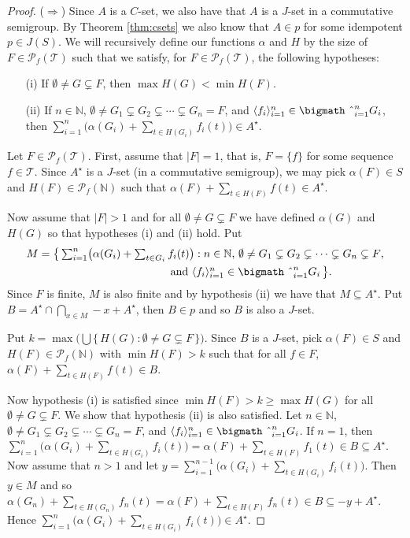 \documentclass[12pt,showtrims]{memoir}
\theoremstyle{plain}
\theoremstyle{definition}
\newcommand{\la}{\langle}
\newcommand{\ra}{\rangle}
\newcommand{\bbN}{\mathbb{N}}
\newcommand{\calT}{\mathcal{T}}
\newcommand{\Pf}{\mathcal{P}_f}
\newcommand{\bigtimes}{\hbox{\bigmath \char'2}}
\begin{document}
\begin{proof}
  ($\Rightarrow$)
  Since $A$ is a $C$-set, we also have that $A$ is a $J$-set in a commutative semigroup.
  By Theorem \ref{thm:csets} we also know that $A \in p$ for some idempotent $p \in J(S)$. 
  We will recursively define our functions $\alpha$ and $H$ by the size of $F \in \Pf(\calT)$ such that we satisfy, for $F \in \Pf(\calT)$, the following hypotheses:
  \begin{itemize}
    \item[(i)] If $\emptyset \ne G \subsetneq F$, then $\max H(G) < \min H(F)$.
      
    \item[(ii)] If $n \in \bbN$, $\emptyset \ne G_1 \subsetneq G_2 \subsetneq \cdots \subsetneq G_n = F$, and $\la f_i \ra_{i=1}^n \in \bigtimes_{i=1}^n G_i$, then $\sum_{i=1}^n\bigl( \alpha(G_i) + \sum_{t \in H(G_i)} f_i(t)\bigr) \in A^\star$. 
  \end{itemize}
  
  Let $F \in \Pf(\calT)$.
  First, assume that $|F| = 1$, that is, $F = \{f\}$ for some sequence $f \in \calT$.
  Since $A^\star$ is a $J$-set (in a commutative semigroup), we may pick $\alpha(F) \in S$ and $H(F) \in \Pf(\bbN)$ such that $\alpha(F) + \sum_{t \in H(F)} f(t) \in A^\star$.

  Now assume that $|F| > 1$ and for all $\emptyset \ne G \subsetneq F$ we have defined $\alpha(G)$ and $H(G)$ so that hypotheses (i) and (ii) hold.
  Put
  \begin{align*}
    M &=\textstyle \bigl\{\, \sum_{i=1}^n \bigl( \alpha(G_i) + \sum_{t \in G_i} f_i(t) \bigr) : \mbox{$n \in \bbN$, $\emptyset \ne G_1 \subsetneq G_2 \subsetneq \cdots \subsetneq G_n \subsetneq F$,} \\
    &\hspace{12em} \mbox{and $\la f_i \ra_{i=1}^n \in \bigtimes_{i=1}^n G_i$} \,\bigr\}.
  \end{align*}
  Since $F$ is finite, $M$ is also finite and by hypothesis (ii) we have that $M \subseteq A^\star$.
  Put $B = A^\star \cap \bigcap_{x \in M} -x+A^\star$, then $B \in p$ and so $B$ is also a $J$-set.

  Put $k = \max \bigl( \bigcup\{\, H(G) : \emptyset \ne G \subsetneq F\,\} \bigr)$.
  Since $B$ is a $J$-set, pick $\alpha(F) \in S$ and $H(F) \in \Pf(\bbN)$ with $\min H(F) > k$ such that for all $f \in F$, $\alpha(F) + \sum_{t \in H(F)} f(t) \in B$. 

  Now hypothesis (i) is satisfied since $\min H(F) > k \ge \max H(G)$ for all $\emptyset \ne G \subsetneq F$. 
  We show that hypothesis (ii) is also satisfied.
  Let $n \in \bbN$, $\emptyset \ne G_1 \subsetneq G_2 \subsetneq \cdots \subsetneq G_n = F$, and $\la f_i \ra_{i=1}^n \in \bigtimes_{i=1}^n G_i$. 
  If $n = 1$, then $\sum_{i=1}^n \bigl( \alpha(G_i) + \sum_{t \in H(G_i)} f_i(t)\bigr) = \alpha(F) + \sum_{t \in H(F)} f_1(t) \in B \subseteq A^\star$. 
  Now assume that $n > 1$ and let $y = \sum_{i=1}^{n-1}\bigl( \alpha(G_i) + \sum_{t \in H(G_i)} f_i(t) \bigr)$.
  Then $y \in M$ and so $\alpha(G_n) + \sum_{t \in H(G_n)} f_n(t) = \alpha(F) + \sum_{t \in H(F)} f_n(t) \in B \subseteq -y + A^\star$. 
  Hence $\sum_{i=1}^n\bigl( \alpha(G_i) + \sum_{t \in H(G_i)} f_i(t) \bigr) \in A^\star$.


\end{proof}
\end{document}
